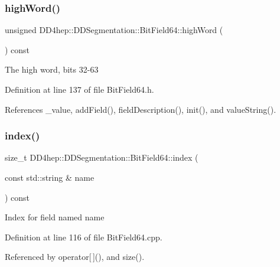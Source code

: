 \subsubsection{\texorpdfstring{high\+Word()}{highWord()}}
{\footnotesize\ttfamily unsigned D\+D4hep\+::\+D\+D\+Segmentation\+::\+Bit\+Field64\+::high\+Word (\begin{DoxyParamCaption}{ }\end{DoxyParamCaption}) const\hspace{0.3cm}{\ttfamily [inline]}}

The high word, bits 32-\/63 

Definition at line 137 of file Bit\+Field64.\+h.



References \+\_\+value, add\+Field(), field\+Description(), init(), and value\+String().

\hypertarget{class_d_d4hep_1_1_d_d_segmentation_1_1_bit_field64_ac195bfa279e2fa29e0a0e987d3f0e7e9}{}\label{class_d_d4hep_1_1_d_d_segmentation_1_1_bit_field64_ac195bfa279e2fa29e0a0e987d3f0e7e9} 
\subsubsection{\texorpdfstring{index()}{index()}}
{\footnotesize\ttfamily size\+\_\+t D\+D4hep\+::\+D\+D\+Segmentation\+::\+Bit\+Field64\+::index (\begin{DoxyParamCaption}\item[{const std\+::string \&}]{name }\end{DoxyParamCaption}) const}

Index for field named \textquotesingle{}name\textquotesingle{} 

Definition at line 116 of file Bit\+Field64.\+cpp.



Referenced by operator\mbox{[}$\,$\mbox{]}(), and size().

\hypertarget{class_d_d4hep_1_1_d_d_segmentation_1_1_bit_field64_a05fc3d97d522cd5e1d7cf94483c89bc4}{}\label{class_d_d4hep_1_1_d_d_segmentation_1_1_bit_field64_a05fc3d97d522cd5e1d7cf94483c89bc4} 
